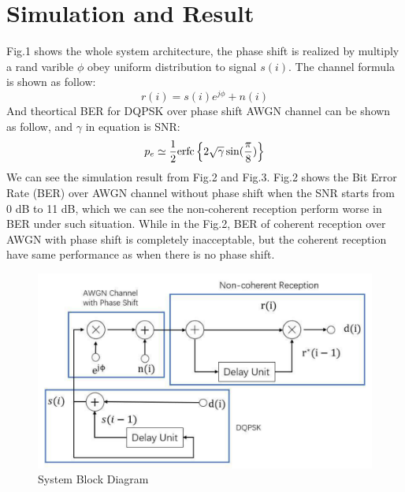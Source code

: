 \documentclass[technicalreport]{ieicej}
\begin{document}
\section{Simulation and Result}
Fig.1 shows the whole system architecture, the phase shift is realized by multiply a rand varible $\phi$ obey uniform distribution to signal $s(i)$. The channel formula is shown as follow:\begin{equation}
r(i)=s(i)e^{j\phi}+n(i)
\end{equation}
And theortical BER for DQPSK over phase shift AWGN channel can be shown as follow, and $\gamma$ in equation is SNR:
\begin{equation}
p_e \simeq \frac{1}{2}{\rm erfc}\left \{ 2\sqrt{\gamma}\sin(\frac{\pi}{8}) \right \}
\end{equation}
We can see the simulation result from Fig.2 and Fig.3. Fig.2 shows the Bit Error Rate (BER) over AWGN channel without phase shift when the SNR starts from 0 dB to 11 dB, which we can see the non-coherent reception perform worse in BER under such situation. While in the Fig.2, BER of coherent reception over AWGN with phase shift is completely inacceptable, but the coherent reception have same performance as when there is no phase shift.

\begin{figure}[ht]
	\begin{center}
		\includegraphics[scale=0.5]{fig/system.pdf}
		\caption{System Block Diagram}
		\label{fig:label}
	\end{center}
\end{figure}
\end{document}
